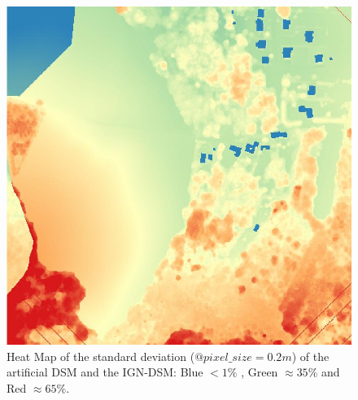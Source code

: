 \documentclass[a4paper, 11pt]{article}
\begin{document}
	
	\begin{figure}[H]
		\begin{center}
			\caption{\label{img::heatmap} Heat Map of the standard deviation ($@ pixel\_size=0.2m$) of the artificial DSM and the IGN-DSM: Blue $< 1\%$ , Green $\approx 35\%$ and Red $\approx 65\%$.}
			\includegraphics[scale=.3]{images/raster/elancourt/heat_map.png}
		\end{center}
	\end{figure}
	
\end{document}
